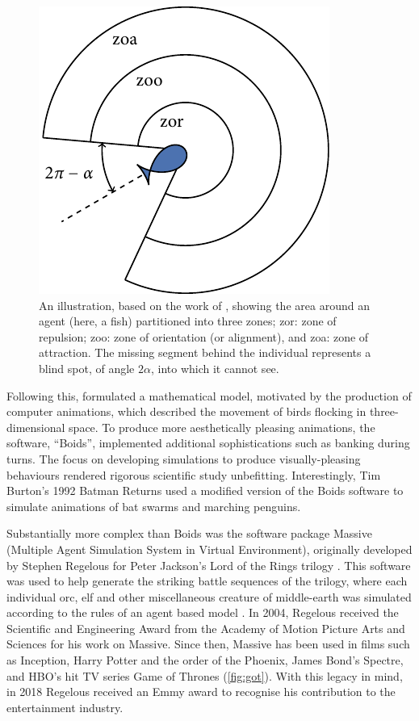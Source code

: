 \begin{figure}[tb]
  \includegraphics{zonal_tikz.pdf}
  \caption{An illustration, based on the work of \textcite{aoki82}, showing the
    area around an agent (here, a fish) partitioned into three zones; zor:
    zone of repulsion; zoo: zone of orientation (or alignment), and zoa: zone
    of attraction. The missing segment behind the individual represents a blind
    spot, of angle $2\alpha$, into which it cannot see.}
  \label{fig:zone_illustration}
\end{figure}

Following this, \textcite{reynolds87} formulated a mathematical model,
motivated by the production of computer animations, which described the
movement of birds flocking in three-dimensional space. To produce more
aesthetically pleasing animations, the software, ``Boids'', implemented
additional sophistications such as banking during turns. The focus on
developing simulations to produce visually-pleasing behaviours rendered
rigorous scientific study unbefitting. Interestingly, Tim Burton's 1992 Batman
Returns used a modified version of the Boids software to simulate animations of
bat swarms and marching penguins.

Substantially more complex than Boids was the software package Massive
(Multiple Agent Simulation System in Virtual Environment), originally developed
by Stephen Regelous for Peter Jackson's Lord of the Rings trilogy
\parencite{koeppel02}. This software was used to help generate the striking
battle sequences of the trilogy, where each individual orc, elf and other
miscellaneous creature of middle-earth was simulated according to the rules of
an agent based model \parencite{robbins17}. In 2004, Regelous received the
Scientific and Engineering Award from the Academy of Motion Picture Arts and
Sciences for his work on Massive. Since then, Massive has been used in films
such as Inception, Harry Potter and the order of the Phoenix, James Bond's
Spectre, and HBO's hit TV series Game of Thrones (\cref{fig:got}). With this
legacy in mind, in 2018 Regelous received an Emmy award to recognise his
contribution to the entertainment industry.

